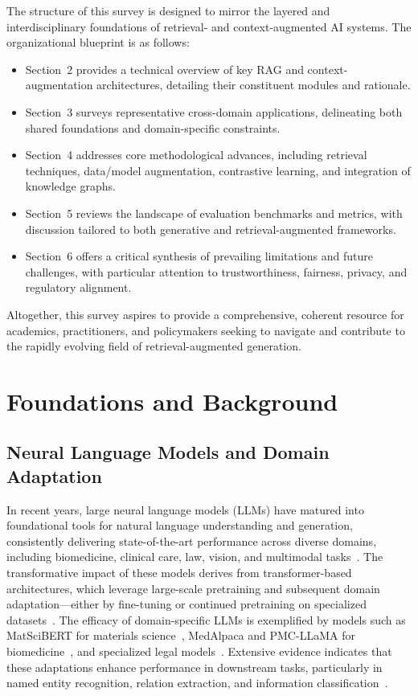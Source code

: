 The structure of this survey is designed to mirror the layered and interdisciplinary foundations of retrieval- and context-augmented AI systems. The organizational blueprint is as follows:
\begin{itemize}
    \item Section~2 provides a technical overview of key RAG and context-augmentation architectures, detailing their constituent modules and rationale.
    \item Section~3 surveys representative cross-domain applications, delineating both shared foundations and domain-specific constraints.
    \item Section~4 addresses core methodological advances, including retrieval techniques, data/model augmentation, contrastive learning, and integration of knowledge graphs.
    \item Section~5 reviews the landscape of evaluation benchmarks and metrics, with discussion tailored to both generative and retrieval-augmented frameworks.
    \item Section~6 offers a critical synthesis of prevailing limitations and future challenges, with particular attention to trustworthiness, fairness, privacy, and regulatory alignment.
\end{itemize}
Altogether, this survey aspires to provide a comprehensive, coherent resource for academics, practitioners, and policymakers seeking to navigate and contribute to the rapidly evolving field of retrieval-augmented generation.

\section{Foundations and Background}

\subsection{Neural Language Models and Domain Adaptation}

In recent years, large neural language models (LLMs) have matured into foundational tools for natural language understanding and generation, consistently delivering state-of-the-art performance across diverse domains, including biomedicine, clinical care, law, vision, and multimodal tasks~\cite{ref1,ref2,ref3,ref6,ref7,ref8,ref29,ref31,ref42,ref48,ref52,ref63}. The transformative impact of these models derives from transformer-based architectures, which leverage large-scale pretraining and subsequent domain adaptation—either by fine-tuning or continued pretraining on specialized datasets~\cite{ref6,ref31,ref63}. The efficacy of domain-specific LLMs is exemplified by models such as MatSciBERT for materials science~\cite{ref29}, MedAlpaca and PMC-LLaMA for biomedicine~\cite{ref3,ref31,ref48}, and specialized legal models~\cite{ref8}. Extensive evidence indicates that these adaptations enhance performance in downstream tasks, particularly in named entity recognition, relation extraction, and information classification~\cite{ref3,ref29,ref31,ref42,ref48}.

